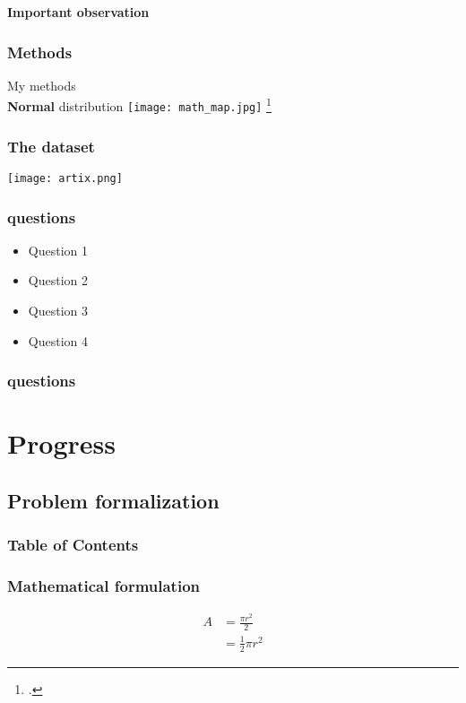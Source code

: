 \documentclass{beamer}
\begin{document}
  \begin{frame}
    \centering
    \textbf{Important observation}
  \end{frame}


  \begin{frame}
    \frametitle{Methods}

    \centering
    My methods \\ [0.5ex]
    \textbf{Normal} distribution
    \texttt{[image: math\_map.jpg]}
    \footcite{Gaussian_derivation}

  \end{frame}

  \begin{frame}
    \frametitle{The dataset}

    \centering
    \texttt{[image: artix.png]}
    \vfill

  \end{frame}

  \begin{frame}
    \frametitle{questions}
    \begin{itemize}
      \item <1-> Question 1
      \item <2-> Question 2
      \item <3> Question 3
      \item <4-> Question 4
    \end{itemize}
  \end{frame}

  \begin{frame}
    \frametitle{questions}
  \end{frame}



\section{Progress}
\subsection{Problem formalization}

  \begin{frame}
    \frametitle{Table of Contents}
    \tableofcontents[currentsection]
  \end{frame}

  \begin{frame}
    \frametitle{Mathematical formulation}
    \begin{equation} \label{eq1}
    \begin{split}
    A & = \frac{\pi r^2}{2} \\
     & = \frac{1}{2} \pi r^2
    \end{split}
    \end{equation}

  \end{frame}
\end{document}

